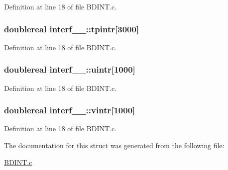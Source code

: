 Definition at line 18 of file B\+D\+I\+N\+T.\+c.

\subsubsection[{\texorpdfstring{tpintr}{tpintr}}]{\setlength{\rightskip}{0pt plus 5cm}doublereal interf\+\_\+\_\+\+::tpintr\mbox{[}3000\mbox{]}}\hypertarget{structinterf__1___a32d34302e76a924d07ba60ea1329446d}{}\label{structinterf__1___a32d34302e76a924d07ba60ea1329446d}


Definition at line 18 of file B\+D\+I\+N\+T.\+c.

\subsubsection[{\texorpdfstring{uintr}{uintr}}]{\setlength{\rightskip}{0pt plus 5cm}doublereal interf\+\_\+\_\+\+::uintr\mbox{[}1000\mbox{]}}\hypertarget{structinterf__1___ac024932f4ad99bdab574604dbfe1fbca}{}\label{structinterf__1___ac024932f4ad99bdab574604dbfe1fbca}


Definition at line 18 of file B\+D\+I\+N\+T.\+c.

\subsubsection[{\texorpdfstring{vintr}{vintr}}]{\setlength{\rightskip}{0pt plus 5cm}doublereal interf\+\_\+\_\+\+::vintr\mbox{[}1000\mbox{]}}\hypertarget{structinterf__1___acbe062f4078a10eb4b3aba61e54f0576}{}\label{structinterf__1___acbe062f4078a10eb4b3aba61e54f0576}


Definition at line 18 of file B\+D\+I\+N\+T.\+c.



The documentation for this struct was generated from the following file\+:\begin{DoxyCompactItemize}
\item 
\hyperlink{BDINT_8c}{B\+D\+I\+N\+T.\+c}\end{DoxyCompactItemize}
